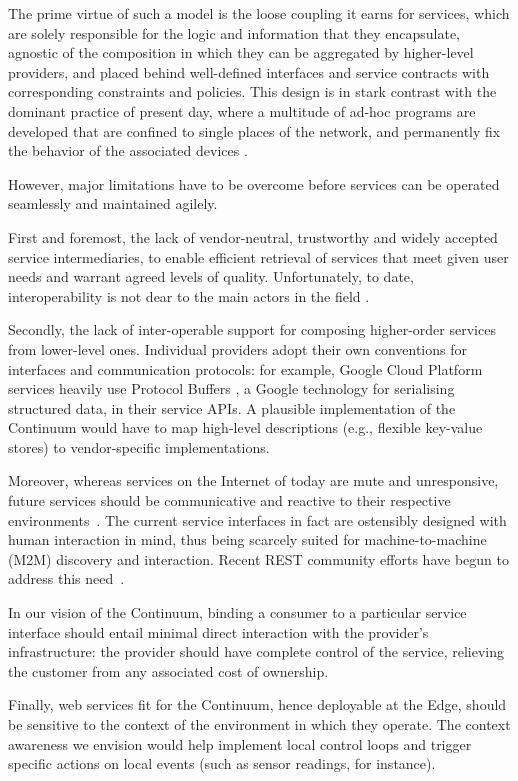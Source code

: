 The prime virtue of such a model is the loose coupling it earns for services, which are solely responsible for the logic and information that they encapsulate, agnostic of the composition in which they can be aggregated by higher-level providers, and placed behind well-defined interfaces and service contracts with corresponding constraints and policies.
This design is in stark contrast with the dominant practice of present day, where a multitude of ad-hoc programs are developed that are confined to single places of the network, and permanently fix the behavior of the associated devices \cite{beckman2020harnessing}.

However, major limitations have to be overcome before services can be operated seamlessly and maintained agilely.  

First and foremost, the lack of vendor-neutral, trustworthy and widely accepted service intermediaries, to enable efficient retrieval of services that meet given user needs and warrant agreed levels of quality. Unfortunately, to date, interoperability is not dear to the main actors in the field \cite{grozev2014inter}.

Secondly, the lack of inter-operable support for composing higher-order services from lower-level ones. 
Individual providers adopt their own conventions for interfaces and communication protocols: for example, Google Cloud Platform services heavily use Protocol Buffers \cite{protobuf}, a Google technology for serialising structured data, in their service APIs. 
A plausible implementation of the Continuum would have to map high-level descriptions (e.g., flexible key-value stores) to vendor-specific implementations.

Moreover, whereas services on the Internet of today are mute and unresponsive, future services should be communicative and reactive to their respective environments~\cite{haller2008internet}. 
The current service interfaces in fact are ostensibly designed with human interaction in mind, thus being scarcely suited for machine-to-machine (M2M) discovery and interaction. 
Recent REST community efforts have begun to address this need~\cite{openapi}.

In our vision of the Continuum, binding a consumer to a particular service interface should entail minimal direct interaction with the provider's infrastructure: the provider should have complete control of the service, relieving the customer from any associated cost of ownership.

Finally, web services fit for the Continuum, hence deployable at the Edge, should be sensitive to the context of the environment in which they operate.
The context awareness we envision would help implement local control loops and trigger specific actions on local events (such as sensor readings, for instance).

